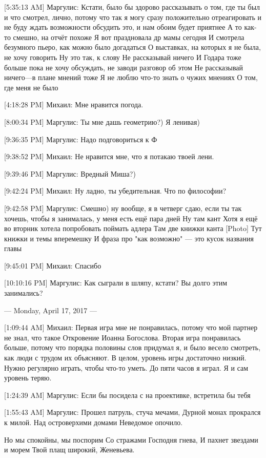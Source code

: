 \documentclass{article}
\begin{document}
[5:35:13 AM] Маргулис:
Кстати, было бы здорово рассказывать о том, где ты был и что смотрел, лично, потому что так я могу сразу положительно отреагировать и не буду ждать возможности обсудить это, и нам обоим будет приятнее
 А то как-то смешно, на отчёт похоже
 Я вот праздновала др мамы сегодня
 И смотрела безумного пьеро, как можно было догадаться
 О выставках, на которых я не была, не хочу говорить
 Ну это так, к слову
 Не рассказывай ничего
 И Годара тоже больше пока не хочу обсуждать, не заводи разговор об этом
 Не рассказывай ничего—в плане мнений тоже
 Я не люблю что-то знать о чужих мнениях
 О том, где меня не было

[4:18:28 PM] Михаил:
Мне нравится погода.

[8:00:34 PM] Маргулис:
Ты мне дашь геометрию?)
 Я ленивая)

[9:36:35 PM] Маргулис:
Надо подговориться к Ф

[9:38:52 PM] Михаил:
Не нравится мне, что я потакаю твоей лени.

[9:39:46 PM] Маргулис:
Вредный Миша?)

[9:42:24 PM] Михаил:
Ну ладно, ты убедительная.
 Что по философии?

[9:42:58 PM] Маргулис:
Смешно) ну вообще, я в четверг сдаю, если ты так хочешь, чтобы я занималась, у меня есть ещё пара дней
 Ну там кант
 Хотя я ещё во вторник хотела попробовать поймать адлера
 Там две книжки канта
 [Photo]
 Тут книжки и темы вперемешку
 И фраза про "как возможно" — это кусок названия главы

[9:45:01 PM] Михаил:
Спасибо

[10:10:16 PM] Маргулис:
Как сыграли в шляпу, кстати? Вы долго этим занимались?

--- Monday, April 17, 2017 ---

[1:09:44 AM] Михаил:
Первая игра мне не понравилась, потому что мой партнер не знал, что такое Откровение Иоанна Богослова. Вторая игра понравилась больше, потому что порядка половины слов придумал я, и было весело смотреть, как люди с трудом их объясняют. В целом, уровень игры достаточно низкий. Нужно регулярно играть, чтобы что-то уметь. До пяти часов я играл.
 Я и сам уровень теряю.

[1:24:39 AM] Маргулис:
Если бы посидела с на проективке, встретила бы тебя

[1:55:43 AM] Маргулис:
Прошел патруль, стуча мечами,
Дурной монах прокрался к милой.
Над островерхими домами
Неведомое опочило.

Но мы спокойны, мы поспорим
Со стражами Господня гнева,
И пахнет звездами и морем
Твой плащ широкий, Женевьева.
\end{document}
